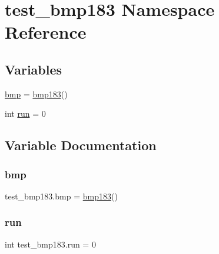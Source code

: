 \hypertarget{namespacetest__bmp183}{}\section{test\+\_\+bmp183 Namespace Reference}
\label{namespacetest__bmp183}
\subsection*{Variables}
\begin{DoxyCompactItemize}
\item 
\hyperlink{namespacetest__bmp183_ae4da7776f7a475254dd44982d887946b}{bmp} = \hyperlink{classbmp183_1_1bmp183}{bmp183}()
\item 
int \hyperlink{namespacetest__bmp183_a065e84718e42850ebd406c603971712d}{run} = 0
\end{DoxyCompactItemize}


\subsection{Variable Documentation}
\mbox{\label{namespacetest__bmp183_ae4da7776f7a475254dd44982d887946b}} 
\subsubsection{\texorpdfstring{bmp}{bmp}}
{\footnotesize\ttfamily test\+\_\+bmp183.\+bmp = \hyperlink{classbmp183_1_1bmp183}{bmp183}()}

\mbox{\label{namespacetest__bmp183_a065e84718e42850ebd406c603971712d}} 
\subsubsection{\texorpdfstring{run}{run}}
{\footnotesize\ttfamily int test\+\_\+bmp183.\+run = 0}

